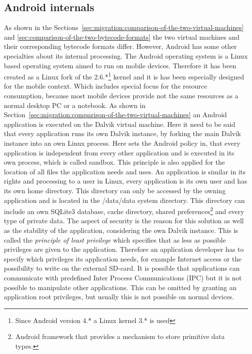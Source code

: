 \subsection{Android internals}
\label{sec:android-internals}
As shown in the Sections~\ref{sec:migration:comparison-of-the-two-virtual-machines} and \ref{sec:comparison-of-the-two-bytecode-formats} the two virtual machines and their corresponding bytecode formats differ.
However, Android has some other specialties about its internal processing.
The Android operating system is a Linux based operating system aimed to run on mobile devices.
Therefore it has been created as a Linux fork of the 2.6.*\footnote{Since Android version 4.* a Linux kernel 3.* is used} kernel and it is has been especially designed for the mobile context.
Which includes special focus for the resource consumption, because most mobile devices provide not the same resources as a normal desktop PC or a notebook.
As shown in Section~\ref{sec:migration:comparison-of-the-two-virtual-machines} an Android application is executed on the Dalvik virtual machine.
Here it need to be said that every application runs its own Dalvik instance, by forking the main Dalvik instance into an own Linux process.
Here sets the Android policy in, that every application is independent from every other application and is executed in its own process, which is called sandbox.
This principle is also applied for the location of all files the application needs and uses.
An application is similar in its rights and processing to a user in Linux, every application is its own user and has its own home directory.
This directory can only be accessed by the owning application and is located in the /data/data system directory.
This directory can include an own SQLite3 database, cache directory, shared preferences\footnote{Android framework that provides a mechanism to store primitive data types.} and every type of private data.
The aspect of security is the reason for this solution as well as the stability of the application, considering the own Dalvik instance.
This is called the \textit{principle of least privilege} which specifies that as less as possible privileges are given to the application.
Therefore an application developer has to specify which privileges its application needs, for example Internet access or the possibility to write on the external SD-card.
It is possible that applications can communicate with predefined Inter Process Communications (IPC) but it is not possible to manipulate other applications.
This can be omitted by granting an application root privileges, but usually this is not possible on normal devices.
